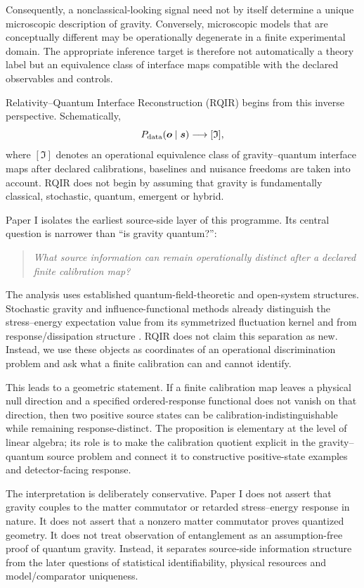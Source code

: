 \documentclass[11pt]{article}
\begin{document}
Consequently, a nonclassical-looking signal need not by itself determine a unique microscopic description of gravity. Conversely, microscopic models that are conceptually different may be operationally degenerate in a finite experimental domain. The appropriate inference target is therefore not automatically a theory label but an equivalence class of interface maps compatible with the declared observables and controls.

Relativity--Quantum Interface Reconstruction (RQIR) begins from this inverse perspective. Schematically,
\begin{equation}
  P_{\rm data}(\bm{o}\mid\bm{s}) \longrightarrow [\mathfrak I],
\end{equation}
where $[\mathfrak I]$ denotes an operational equivalence class of gravity--quantum interface maps after declared calibrations, baselines and nuisance freedoms are taken into account. RQIR does not begin by assuming that gravity is fundamentally classical, stochastic, quantum, emergent or hybrid.

Paper I isolates the earliest source-side layer of this programme. Its central question is narrower than ``is gravity quantum?'':
\begin{quote}
\emph{What source information can remain operationally distinct after a declared finite calibration map?}
\end{quote}

The analysis uses established quantum-field-theoretic and open-system structures. Stochastic gravity and influence-functional methods already distinguish the stress--energy expectation value from its symmetrized fluctuation kernel and from response/dissipation structure \cite{FeynmanVernon1963,Keldysh1965,Kubo1957,HuVerdaguer2008}. RQIR does not claim this separation as new. Instead, we use these objects as coordinates of an operational discrimination problem and ask what a finite calibration can and cannot identify.

This leads to a geometric statement. If a finite calibration map leaves a physical null direction and a specified ordered-response functional does not vanish on that direction, then two positive source states can be calibration-indistinguishable while remaining response-distinct. The proposition is elementary at the level of linear algebra; its role is to make the calibration quotient explicit in the gravity--quantum source problem and connect it to constructive positive-state examples and detector-facing response.

The interpretation is deliberately conservative. Paper I does not assert that gravity couples to the matter commutator or retarded stress--energy response in nature. It does not assert that a nonzero matter commutator proves quantized geometry. It does not treat observation of entanglement as an assumption-free proof of quantum gravity. Instead, it separates source-side information structure from the later questions of statistical identifiability, physical resources and model/comparator uniqueness.
\end{document}
